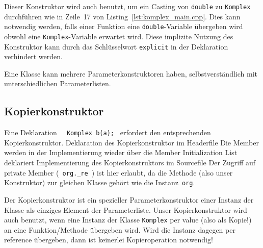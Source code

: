 Dieser Konstruktor wird auch benutzt, um ein Casting
von \texttt{double} zu \texttt{Komplex} durchführen wie in Zeile~17 von
Listing~\ref{lst:komplex_main.cpp}.
Dies kann notwendig werden, falls einer Funktion eine \texttt{double}-Variable
übergeben wird obwohl eine \texttt{Komplex}-Variable erwartet wird.
Diese implizite Nutzung des Konstruktor kann durch das Schlüsselwort
\texttt{explicit} in der Deklaration verhindert werden.

Eine Klasse kann mehrere Parameterkonstruktoren haben, selbstverständlich
mit unterschiedlichen Parameterlisten.

\subsection{Kopierkonstruktor}
\label{p:9.2.3}
%
Eine Deklaration  \verb|  Komplex b(a); | erfordert
den entsprechenden Kopierkonstruktor.
{Deklaration des Kopierkonstruktor im Headerfile}
%
Die Member werden in der Implementierung wieder über die {Member Initialization List}
deklariert
{Implementierung des Kopierkonstruktors im Sourcefile}
%
Der Zugriff auf private Member (\verb| org._re |) ist hier erlaubt, da die Methode
(also unser Konstruktor) zur gleichen Klasse gehört wie die Instanz~\texttt{org}.

Der Kopierkonstruktor ist ein spezieller Parameterkonstruktor einer Instanz der Klasse als
einziges Element der Parameterliste. Unser Kopierkonstruktor wird auch benutzt, wenn eine Instanz
der Klasse \texttt{Komplex} per value (also als Kopie!) an eine Funktion/Methode übergeben wird.
Wird die Instanz dagegen per reference übergeben, dann ist keinerlei Kopieroperation notwendig!
%
%
%
